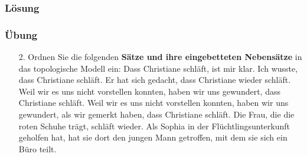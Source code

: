 
	
\begin{frame}
\frametitle{Lösung}

\begin{table}
\centering
{}
\end{table}

\end{frame}




\begin{frame}
\frametitle{Übung}

\begin{itemize}

	\item[2.] Ordnen Sie die folgenden \textbf{Sätze und ihre eingebetteten Nebensätze} in das topologische Modell ein:
\eal
\ex Dass Christiane schläft, ist mir klar.
\ex Ich wusste, dass Christiane schläft.
\ex Er hat sich gedacht, dass Christiane wieder schläft.
\ex Weil wir es uns nicht vorstellen konnten, haben wir uns gewundert, dass Christiane schläft.
\ex Weil wir es uns nicht vorstellen konnten, haben wir uns gewundert, als wir gemerkt haben, dass Christiane schläft.
\ex Die Frau, die die roten Schuhe trägt, schläft wieder.
\ex Als Sophia in der Flüchtlingsunterkunft geholfen hat, hat sie dort den jungen Mann getroffen, mit dem sie sich ein Büro teilt.  	
\zl
	
\end{itemize}

\end{frame}

